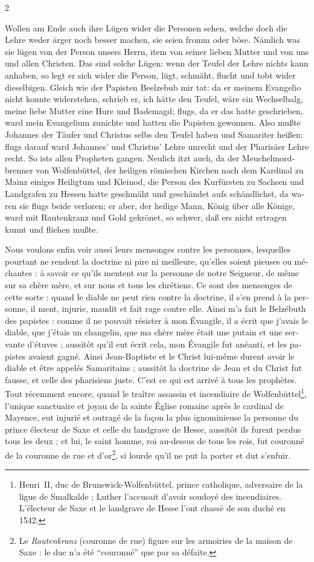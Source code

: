 \documentclass[a4paper,12pt]{article}
\newcommand\chunks[2]{%
\begin{leftcolumn*}\begin{otherlanguage}{german}%
{#1}%
\end{otherlanguage}\end{leftcolumn*}%
\begin{rightcolumn}\begin{otherlanguage}{french}%
{#2}%
\end{otherlanguage}\end{rightcolumn}%
}
\begin{document}
\begin{paracol}{2}
  \chunks{Wollen am Ende auch ihre Lügen wider die Personen sehen, welche doch die Lehre weder ärger noch besser machen, sie seien fromm oder böse. Nämlich was sie lügen von der Person unsers Herrn, item von seiner lieben Mutter und von uns und allen Christen. Das sind solche Lügen: wenn der Teufel der Lehre nichts kann anhaben, so legt er sich wider die Person, lügt, schmäht, flucht und tobt wider dieselbigen. Gleich wie der Papisten Beelzebub mir tat: da er meinem Evangelio nicht konnte widerstehen, schrieb er, ich hätte den Teufel, wäre ein Wechselbalg, meine liebe Mutter eine Hure und Bademagd; flugs, da er das hatte geschrieben, ward mein Evangelium zunichte und hatten die Papisten gewonnen. Also mußte Johannes der Täufer und Christus selbs den Teufel haben und Samariter heißen; flugs darauf ward Johannes’ und Christus’ Lehre unrecht und der Pharisäer Lehre recht. So ists allen Propheten gangen. Neulich itzt auch, da der Meuchelmordbrenner von Wolfenbüttel, der heiligen römischen Kirchen nach dem Kardinal zu Mainz einiges Heiligtum und Kleinod, die Person des Kurfürsten zu Sachsen und Landgrafen zu Hessen hatte geschmäht und geschändet aufs schändlichst, da waren sie flugs beide verloren; er aber, der heilige Mann, König über alle Könige, ward mit Rautenkranz und Gold gekrönet, so schwer, daß ers nicht ertragen kunnt und fliehen mußte.}
         {Nous voulons enfin voir aussi leurs mensonges contre les personnes, lesquelles pourtant ne rendent la doctrine ni pire ni meilleure, qu’elles soient pieuses ou méchantes : à savoir ce qu’ils mentent sur la personne de notre Seigneur, de même sur sa chère mère, et sur nous et tous les chrétiens. Ce sont des mensonges de cette sorte : quand le diable ne peut rien contre la doctrine, il s’en prend à la personne, il ment, injurie, maudit et fait rage contre elle. Ainsi m’a fait le Belzébuth des papistes : comme il ne pouvait résister à mon Évangile, il a écrit que j’avais le diable, que j’étais un changelin, que ma chère mère était une putain et une servante d’étuves ; aussitôt qu’il eut écrit cela, mon Évangile fut anéanti, et les papistes avaient gagné. Ainsi Jean-Baptiste et le Christ lui-même durent avoir le diable et être appelés Samaritains ; aussitôt la doctrine de Jean et du Christ fut fausse, et celle des pharisiens juste. C’est ce qui est arrivé à tous les prophètes. Tout récemment encore, quand le traître assassin et incendiaire de Wolfenbüttel\footnote{Henri~II, duc de Brunswick-Wolfenbüttel, prince catholique, adversaire de la ligue de Smalkalde ; Luther l’accusait d’avoir soudoyé des incendiaires. L’électeur de Saxe et le landgrave de Hesse l’ont chassé de son duché en 1542.}, l’unique sanctuaire et joyau de la sainte Église romaine après le cardinal de Mayence, eut injurié et outragé de la façon la plus ignominieuse la personne du prince électeur de Saxe et celle du landgrave de Hesse, aussitôt ils furent perdus tous les deux ; et lui, le saint homme, roi au-dessus de tous les rois, fut couronné de la couronne de rue et d’or\footnote{Le \foreignlanguage{german}{\emph{Rautenkranz}} (couronne de rue) figure sur les armoiries de la maison de Saxe : le duc n’a été \enquote{couronné} que par sa défaite.}, si lourde qu’il ne put la porter et dut s’enfuir.}

\end{paracol}
\end{document}
